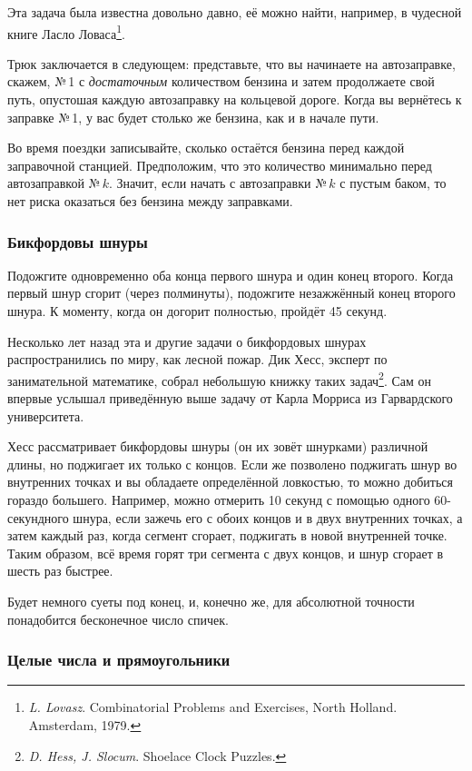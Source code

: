 \documentclass[twoside]{book}
\begin{document}
Эта задача была известна довольно давно, её можно найти, например, в чудесной книге Ласло Ловаса\footnote{\emph{L. Lovasz}. {Combinatorial Problems and Exercises}, North Holland. Amsterdam, 1979.}.

\medskip

Трюк заключается в следующем:
представьте, что вы начинаете на автозаправке, скажем, №\,1 с \emph{достаточным} количеством бензина и затем продолжаете свой путь, опустошая каждую автозаправку на кольцевой дороге.
Когда вы вернётесь к заправке №\,1, 
у вас будет столько же бензина, как и в начале пути.

Во время поездки записывайте, сколько остаётся бензина перед каждой заправочной станцией.
Предположим, что это количество минимально перед автозаправкой №\,$k$.
Значит, если начать с автозаправки №\,$k$ с пустым баком, то нет риска оказаться без бензина между заправками.
\heart

\subsubsection*{Бикфордовы шнуры} %

Подожгите одновременно оба конца первого шнура и один конец второго.
Когда первый шнур сгорит (через полминуты), подожгите незажжённый конец второго шнура.
К моменту, когда он догорит полностью, пройдёт 45 секунд.
\heart

Несколько лет назад эта и другие задачи о бикфордовых шнурах распространились по миру, как лесной пожар.
Дик Хесс, эксперт по занимательной математике, 
собрал небольшую книжку таких задач\footnote{\emph{D. Hess, J. Slocum}. {Shoelace Clock Puzzles}.}.
Сам он впервые услышал приведённую выше задачу от Карла Морриса из Гарвардского университета.

Хесс рассматривает бикфордовы шнуры (он их зовёт шнурками) различной длины, но поджигает их только с концов.
Если же позволено поджигать шнур во внутренних точках и вы обладаете определённой ловкостью, то можно добиться гораздо большего.
Например, можно отмерить 10 секунд с помощью одного 60-секундного шнура, если зажечь его с обоих концов и в двух внутренних точках, а затем каждый раз, когда сегмент сгорает, поджигать в новой внутренней точке.
Таким образом, всё время горят три сегмента с двух концов, и шнур сгорает в шесть раз быстрее.

Будет немного суеты под конец, и, конечно же, для абсолютной точности
понадобится бесконечное число спичек.

\subsubsection*{Целые числа и прямоугольники} %
\end{document}
